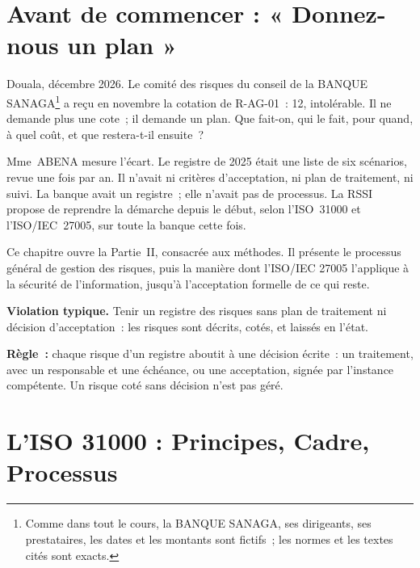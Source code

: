 \bigskip

\section*{Avant de commencer : « Donnez-nous un plan »}

Douala, décembre 2026. Le comité des risques du conseil de la BANQUE
SANAGA\footnote{Comme dans tout le cours, la BANQUE SANAGA, ses
dirigeants, ses prestataires, les dates et les montants sont fictifs~; les
normes et les textes cités sont exacts.} a reçu en novembre la cotation de
R-AG-01~: 12, intolérable. Il ne demande plus une cote~; il demande un
plan. Que fait-on, qui le fait, pour quand, à quel coût, et que restera-t-il
ensuite~?

Mme~ABENA mesure l'écart. Le registre de 2025 était une liste de six
scénarios, revue une fois par an. Il n'avait ni critères d'acceptation, ni
plan de traitement, ni suivi. La banque avait un registre~; elle n'avait
pas de processus. La RSSI propose de reprendre la démarche depuis le
début, selon l'ISO~31000 et l'ISO/IEC~27005, sur toute la banque cette
fois.

\medskip

Ce chapitre ouvre la Partie~II, consacrée aux méthodes. Il présente le
processus général de gestion des risques, puis la manière dont l'ISO/IEC
27005 l'applique à la sécurité de l'information, jusqu'à l'acceptation
formelle de ce qui reste.

\begin{boxalert}
\textbf{Violation typique.} Tenir un registre des risques sans plan de
traitement ni décision d'acceptation~: les risques sont décrits, cotés, et
laissés en l'état.

\smallskip
\textbf{Règle~:} chaque risque d'un registre aboutit à une décision
écrite~: un traitement, avec un responsable et une échéance, ou une
acceptation, signée par l'instance compétente. Un risque coté sans
décision n'est pas géré.
\end{boxalert}

\separateur

\section{L'ISO 31000 : Principes, Cadre, Processus}
\label{sec:c03-iso31000}

